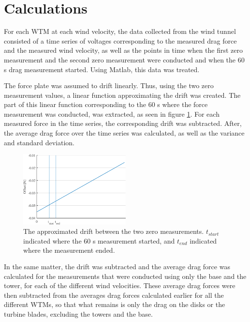 \section{Calculations}

For each \gls{WTM} at each wind velocity, the data collected from the wind tunnel consisted of a time series of voltages corresponding to the measured drag force and the measured wind velocity, as well as the points in time when the first zero measurement and the second zero measurement were conducted and when the 60 \si{\s} drag measurement started. Using Matlab, this data was treated.

The force plate was assumed to drift linearly. Thus, using the two zero measurement values, a linear function approximating the drift was created. The part of this linear function corresponding to the 60 \si{\s} where the force measurement was conducted, was extracted, as seen in figure \ref{Fig:driftAdjust}. For each measured force in the time series, the corresponding drift was subtracted. After, the average drag force over the time series was calculated, as well as the variance and standard deviation. 

\begin{figure}
    \centering
    \includegraphics[width=0.5\textwidth]{0_Images/drift.eps}    
    \caption{The approximated drift between the two zero measurements. $t_{start}$ indicated where the 60 \si{s} measurement started, and $t_{end}$ indicated where the measurement ended.}
    \label{Fig:driftAdjust}
\end{figure}

In the same matter, the drift was subtracted and the average drag force was calculated for the measurements that were conducted using only the base and the tower, for each of the different wind velocities. These average drag forces were then subtracted from the averages drag forces calculated earlier for all the different \gls{WTM}s, so that what remains is only the drag on the disks or the turbine blades, excluding the towers and the base. 

